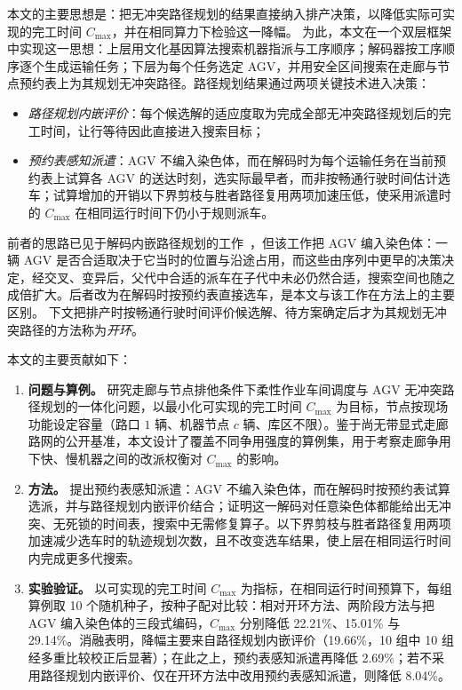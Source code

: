 \documentclass[manuscript,screen,review]{acmart}
\newcommand{\NCases}{10}
\newcommand{\NSeeds}{10}
\newcommand{\GainLoopRule}{19.66\%}      %
\newcommand{\GainLoopProbe}{15.01\%}     %
\newcommand{\GainProbeOpen}{8.04\%}      %
\newcommand{\GainProbeLoop}{2.69\%}      %
\newcommand{\GainEndToEnd}{22.21\%}      %
\newcommand{\GainLyu}{29.14\%}          %
\newcommand{\CellsSigLoopAdj}{10}
\begin{document}
本文的主要思想是：把无冲突路径规划的结果直接纳入排产决策，以降低实际可实现的完工时间 $C_{\max}$，并在相同算力下检验这一降幅。
为此，本文在一个双层框架中实现这一思想：上层用文化基因算法搜索机器指派与工序顺序；解码器按工序顺序逐个生成运输任务；下层为每个任务选定 AGV，并用安全区间搜索在走廊与节点预约表上为其规划无冲突路径。路径规划结果通过两项关键技术进入决策：
\begin{itemize}[leftmargin=*,topsep=2pt,itemsep=1pt]
  \item \emph{路径规划内嵌评价}：每个候选解的适应度取为完成全部无冲突路径规划后的完工时间，让行等待因此直接进入搜索目标；
  \item \emph{预约表感知派遣}：AGV 不编入染色体，而在解码时为每个运输任务在当前预约表上试算各 AGV 的送达时刻，选实际最早者，而非按畅通行驶时间估计选车；试算增加的开销以下界剪枝与胜者路径复用两项加速压低，使采用派遣时的 $C_{\max}$ 在相同运行时间下仍小于规则派车。
\end{itemize}
前者的思路已见于解码内嵌路径规划的工作~\cite{lyu2019approach}，但该工作把 AGV 编入染色体：一辆 AGV 是否合适取决于它当时的位置与沿途占用，而这些由序列中更早的决策决定，经交叉、变异后，父代中合适的派车在子代中未必仍然合适，搜索空间也随之成倍扩大。后者改为在解码时按预约表直接选车，是本文与该工作在方法上的主要区别。
下文把排产时按畅通行驶时间评价候选解、待方案确定后才为其规划无冲突路径的方法称为\emph{开环}。

本文的主要贡献如下：
\begin{enumerate}[leftmargin=*]
\item \textbf{问题与算例。} 研究走廊与节点排他条件下柔性作业车间调度与 AGV 无冲突路径规划的一体化问题，以最小化可实现的完工时间 $C_{\max}$ 为目标，节点按现场功能设定容量（路口 $1$ 辆、机器节点 $c$ 辆、库区不限）。鉴于尚无带显式走廊路网的公开基准，本文设计了覆盖不同争用强度的算例集，用于考察走廊争用下快、慢机器之间的改派权衡对 $C_{\max}$ 的影响。

\item \textbf{方法。} 提出预约表感知派遣：AGV 不编入染色体，而在解码时按预约表试算选派，并与路径规划内嵌评价结合；证明这一解码对任意染色体都能给出无冲突、无死锁的时间表，搜索中无需修复算子。以下界剪枝与胜者路径复用两项加速减少选车时的轨迹规划次数，且不改变选车结果，使上层在相同运行时间内完成更多代搜索。

\item \textbf{实验验证。} 以可实现的完工时间 $C_{\max}$ 为指标，在相同运行时间预算下，每组算例取 \NSeeds{} 个随机种子，按种子配对比较：相对开环方法、两阶段方法与把 AGV 编入染色体的三段式编码，$C_{\max}$ 分别降低 \GainEndToEnd{}、\GainLoopProbe{} 与 \GainLyu{}。消融表明，降幅主要来自路径规划内嵌评价（\GainLoopRule{}，\NCases{} 组中 \CellsSigLoopAdj{} 组经多重比较校正后显著）；在此之上，预约表感知派遣再降低 \GainProbeLoop{}；若不采用路径规划内嵌评价、仅在开环方法中改用预约表感知派遣，则降低 \GainProbeOpen{}。
\end{enumerate}
\end{document}
